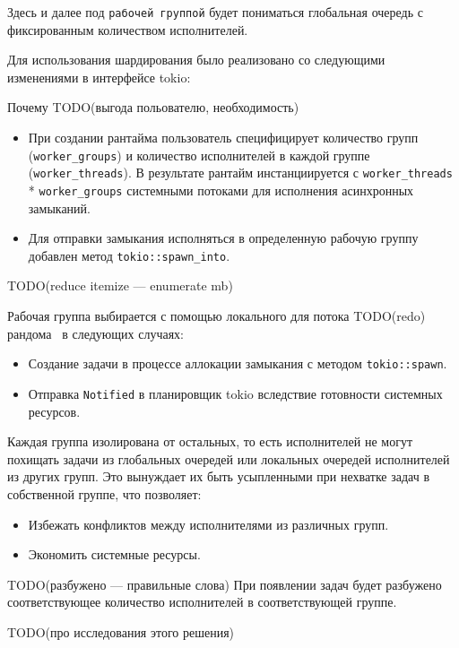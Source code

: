 Здесь и далее под \verb|рабочей группой| будет пониматься глобальная очередь с фиксированным количеством исполнителей.

Для использования шардирования было реализовано со следующими изменениями в интерфейсе tokio:

Почему TODO(выгода польователю, необходимость)

\begin{itemize}

\item При создании рантайма пользователь специфицирует количество групп (\verb|worker_groups|) и количество исполнителей в каждой группе (\verb|worker_threads|). В результате рантайм инстанциируется с \verb|worker_threads| * \verb|worker_groups| системными потоками для исполнения асинхронных замыканий.
\item Для отправки замыкания исполняться в определенную рабочую группу добавлен метод \verb|tokio::spawn_into|.
\end{itemize}

TODO(reduce itemize --- enumerate mb)

Рабочая группа выбирается с помощью локального для потока TODO(redo) рандома~\cite{xorshiftRNG} в следующих случаях:

\begin{itemize}
    \item Создание задачи в процессе аллокации замыкания с методом \verb|tokio::spawn|.
    \item Отправка \verb|Notified| в планировщик tokio вследствие готовности системных ресурсов.
\end{itemize}

Каждая группа изолирована от остальных, то есть исполнителей не могут похищать задачи из глобальных очередей или локальных очередей исполнителей из других групп. Это вынуждает их быть усыпленными при нехватке задач в собственной группе, что позволяет:

\begin{itemize}
    \item Избежать конфликтов между исполнителями из различных групп.
    \item Экономить системные ресурсы.
\end{itemize}

TODO(разбужено --- правильные слова)
При появлении задач будет разбужено соответствующее количество исполнителей в соответствующей группе.

TODO(про исследования этого решения)

